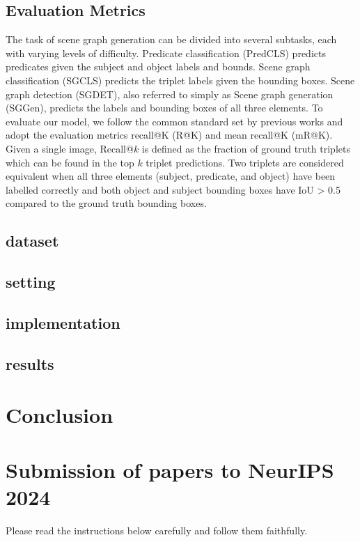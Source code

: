 \documentclass{article}
\begin{document}
\subsection{Evaluation Metrics}
The task of scene graph generation can be divided into several subtasks, each with varying levels of difficulty. Predicate classification (PredCLS)\cite{cong2023reltr,jin2023fast,dornadula2019visual} predicts predicates given the subject and object labels and bounds. Scene graph classification (SGCLS)\cite{cong2023reltr,dornadula2019visual} predicts the triplet labels given the bounding boxes. Scene graph detection (SGDET)\cite{cong2023reltr}, also referred to simply as Scene graph generation (SGGen)\cite{jin2023fast,dornadula2019visual}, predicts the labels and bounding boxes of all three elements.
To evaluate our model, we follow the common standard set by previous works\cite{} and adopt the evaluation metrics recall@K (R@K) and mean recall@K (mR@K). Given a single image, Recall@$k$ is defined as the fraction of ground truth triplets which can be found in the top $k$ triplet predictions. Two triplets are considered equivalent when all three elements (subject, predicate, and object) have been labelled correctly and both object and subject bounding boxes have IoU > 0.5 compared to the ground truth bounding boxes.

\subsection{dataset}
\subsection{setting}
\subsection{implementation}
\subsection{results}
\section{Conclusion}
\section{Submission of papers to NeurIPS 2024}


Please read the instructions below carefully and follow them faithfully.
\end{document}
